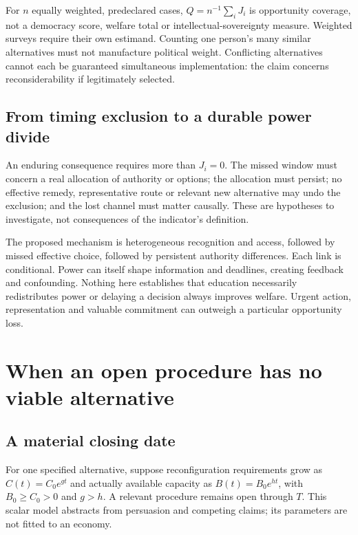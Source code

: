 \documentclass[11pt,a4paper]{article}
\theoremstyle{definition}\newtheorem{definition}{Definition}
\begin{document}
For $n$ equally weighted, predeclared cases, $Q=n^{-1}\sum_iJ_i$ is opportunity coverage, not a democracy score, welfare total or intellectual-sovereignty measure. Weighted surveys require their own estimand. Counting one person's many similar alternatives must not manufacture political weight. Conflicting alternatives cannot each be guaranteed simultaneous implementation: the claim concerns reconsiderability if legitimately selected.

\subsection{From timing exclusion to a durable power divide}
An enduring consequence requires more than $J_i=0$. The missed window must concern a real allocation of authority or options; the allocation must persist; no effective remedy, representative route or relevant new alternative may undo the exclusion; and the lost channel must matter causally. These are hypotheses to investigate, not consequences of the indicator's definition.

The proposed mechanism is heterogeneous recognition and access, followed by missed effective choice, followed by persistent authority differences. Each link is conditional. Power can itself shape information and deadlines, creating feedback and confounding. Nothing here establishes that education necessarily redistributes power or delaying a decision always improves welfare. Urgent action, representation and valuable commitment can outweigh a particular opportunity loss.

\section{When an open procedure has no viable alternative}
\label{sec:review}
\subsection{A material closing date}
For one specified alternative, suppose reconfiguration requirements grow as $C(t)=C_0e^{gt}$ and actually available capacity as $B(t)=B_0e^{ht}$, with $B_0\ge C_0>0$ and $g>h$. A relevant procedure remains open through $T$. This scalar model abstracts from persuasion and competing claims; its parameters are not fitted to an economy.
\end{document}
